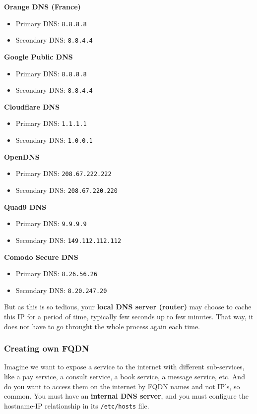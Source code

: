 \documentclass{article}
\begin{document}
\textbf{Orange DNS (France)}
\begin{itemize}
    \item Primary DNS: \texttt{8.8.8.8}
    \item Secondary DNS: \texttt{8.8.4.4}
\end{itemize}

\textbf{Google Public DNS}
\begin{itemize}
    \item Primary DNS: \texttt{8.8.8.8}
    \item Secondary DNS: \texttt{8.8.4.4}
\end{itemize}
    
\textbf{Cloudflare DNS}
\begin{itemize}
    \item Primary DNS: \texttt{1.1.1.1}
    \item Secondary DNS: \texttt{1.0.0.1}
\end{itemize}
    
\textbf{OpenDNS}
\begin{itemize}
    \item Primary DNS: \texttt{208.67.222.222}
    \item Secondary DNS: \texttt{208.67.220.220}
\end{itemize}
    
\textbf{Quad9 DNS}
\begin{itemize}
    \item Primary DNS: \texttt{9.9.9.9}
    \item Secondary DNS: \texttt{149.112.112.112}
\end{itemize}
    
\textbf{Comodo Secure DNS}
\begin{itemize}
    \item Primary DNS: \texttt{8.26.56.26}
    \item Secondary DNS: \texttt{8.20.247.20}
\end{itemize}

But as this is so tedious, your \textbf{local DNS server (router)} may choose to cache this IP for a period of time, typically few seconds up to few minutes. That way, it does not have to go throught the whole process again each time.


\subsubsection{Creating own FQDN}

Imagine we want to expose a service to the internet with different sub-services, like a pay service, a consult service, a book service, a message service, etc. And do you want to access them on the internet by FQDN names and not IP's, so common. You must have an \textbf{internal DNS server}, and you must configure the hostname-IP relationship in its \verb|/etc/hosts| file.
\end{document}
